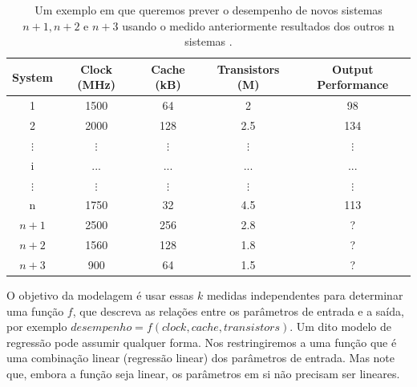 \documentclass[article]{memoir}
\begin{document}
{\begin{table}[h]
		\footnotesize
			\centering
			\caption{Um exemplo em que queremos prever o desempenho de novos	sistemas $n + 1, n + 2$ e $n + 3$ usando o medido anteriormente resultados dos outros n sistemas \cite{Lilja2016}.}
			\label{tab:benchmark}
			\begin{tabular}{@{}ccccc@{}}
				\toprule
				\textbf{System} & \textbf{Clock (MHz)} & \textbf{Cache (kB)} & \textbf{Transistors (M)} & \textbf{Output Performance} \\ 
				\midrule
				1               & 1500                 & 64                  & 2                       & 98                          \\
				2               & 2000                 & 128                 & 2.5                     & 134                         \\
				$\vdots$        & $\vdots$             & $\vdots$            & $\vdots$                & $\vdots$                    \\
				i               & ...                  & ...                 & ...                     & ...                         \\
				$\vdots$        & $\vdots$             & $\vdots$            & $\vdots$                & $\vdots$                    \\
				n               & 1750                 & 32                  & 4.5                     & 113                         \\
				$n+1$           & 2500                 & 256                 & 2.8                     & ?                           \\
				$n+2$           & 1560                 & 128                 & 1.8                     & ?                           \\
				$n+3$           & 900                  & 64                  & 1.5                     & ?                           \\ 
				\bottomrule
			\end{tabular}
	\end{table}

O objetivo da modelagem  é usar essas $k$ medidas independentes  para determinar uma função  $f$, que descreva 
as relações entre os parâmetros de entrada e a saída, por exemplo $desempenho = f (clock, cache, transistors)$.
Um dito modelo de regressão pode assumir qualquer forma. Nos restringiremos a uma função que é uma combinação linear (regressão linear) dos parâmetros de entrada. Mas note que,  embora a função seja linear, os parâmetros em si não precisam ser lineares. 

}
\end{document}
